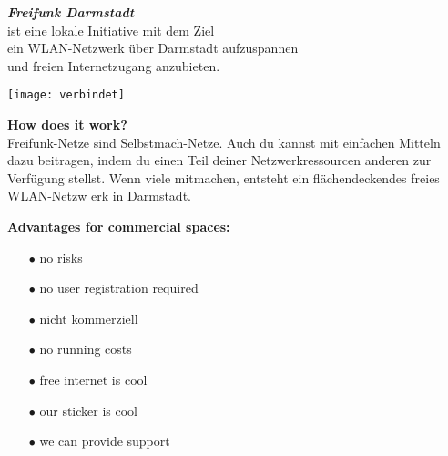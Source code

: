 \documentclass[a4paper]{article}
\begin{document}
\thispagestyle{empty}

\begin{center}
\Huge \textit{\textbf{\textcolor{freifunkpink}{Freifunk Darmstadt}}} \\
\vspace{0.6cm}
\large ist eine lokale Initiative mit dem Ziel \\
\large ein WLAN-Netzwerk über Darmstadt aufzuspannen \\
\large und freien Internetzugang anzubieten.
\normalsize

\vspace{1.5cm}

\hspace*{-0.05 \paperwidth}\texttt{[image: verbindet]}
\end{center}

\vspace{0.7cm}

\begin{Row}
    \begin{Cell}{1}
    \textbf{How does it work?} \\
Freifunk-Netze sind Selbstmach-Netze. Auch du kannst mit einfachen Mitteln dazu
 beitragen, indem du einen Teil deiner Netzwerkressourcen anderen zur Verfügung
 stellst. Wenn viele mitmachen, entsteht ein flächendeckendes freies WLAN-Netzw
erk in Darmstadt.
    \end{Cell}
    \begin{Cell}{1}
    \textbf{Advantages for commercial spaces:} \vspace*{-0.18cm}
	\begin{itemize}
	   \item[\textcolor{freifunkpink}{\Large$\bullet$}] no risks \vspace*{-0.3cm}
	   \item[\textcolor{freifunkpink}{\Large$\bullet$}] no user registration required \vspace*{-0.3cm}
	   \item[\textcolor{freifunkpink}{\Large$\bullet$}] nicht kommerziell \vspace*{-0.3cm}
	   \item[\textcolor{freifunkpink}{\Large$\bullet$}] no running costs \vspace*{-0.3cm}
	   \item[\textcolor{freifunkpink}{\Large$\bullet$}] free internet is cool\vspace*{-0.3cm}
	   \item[\textcolor{freifunkpink}{\Large$\bullet$}] our sticker is cool\vspace*{-0.3cm}
	   \item[\textcolor{freifunkpink}{\Large$\bullet$}] we can provide support
	\end{itemize}
    \end{Cell}
\end{Row}
\newpage
\end{document}
